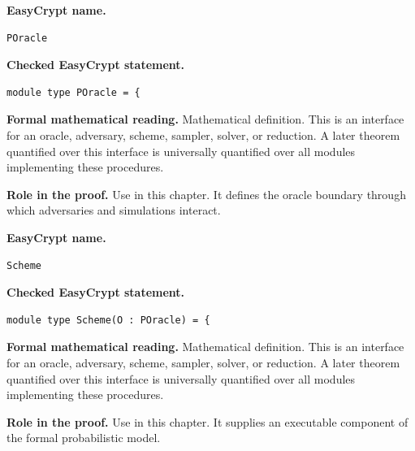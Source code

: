 \begin{formaldefinition}
\noindent\textbf{EasyCrypt name.}
\begin{lstlisting}[language=EasyCrypt,basicstyle=\ttfamily\scriptsize]
POracle
\end{lstlisting}
\noindent\textbf{Checked EasyCrypt statement.}
\begin{lstlisting}[language=EasyCrypt,basicstyle=\ttfamily\scriptsize]
module type POracle = {
\end{lstlisting}
\noindent\textbf{Formal mathematical reading.}
Mathematical definition. This is an interface for an oracle, adversary, scheme, sampler, solver, or reduction.  A later theorem quantified over this interface is universally quantified over all modules implementing these procedures.

\noindent\textbf{Role in the proof.}
Use in this chapter. It defines the oracle boundary through which adversaries and simulations interact.

\end{formaldefinition}

\begin{formaldefinition}
\noindent\textbf{EasyCrypt name.}
\begin{lstlisting}[language=EasyCrypt,basicstyle=\ttfamily\scriptsize]
Scheme
\end{lstlisting}
\noindent\textbf{Checked EasyCrypt statement.}
\begin{lstlisting}[language=EasyCrypt,basicstyle=\ttfamily\scriptsize]
module type Scheme(O : POracle) = {
\end{lstlisting}
\noindent\textbf{Formal mathematical reading.}
Mathematical definition. This is an interface for an oracle, adversary, scheme, sampler, solver, or reduction.  A later theorem quantified over this interface is universally quantified over all modules implementing these procedures.

\noindent\textbf{Role in the proof.}
Use in this chapter. It supplies an executable component of the formal probabilistic model.

\end{formaldefinition}

